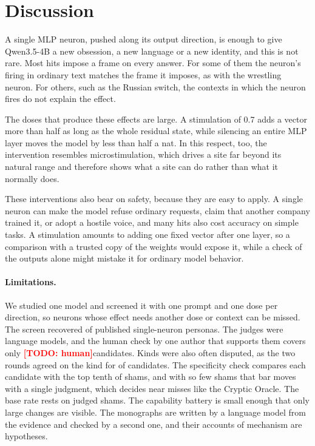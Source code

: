 \documentclass[11pt]{article}
\providecommand{\HumanRated}{\todo{human}}\providecommand{\HumanUnsure}{\todo{human}}\providecommand{\HumanChangeN}{\todo{human}}
\newcommand{\todo}[1]{\textcolor{red}{\textbf{[TODO: #1]}}}
\begin{document}
\section{Discussion}

A single MLP neuron, pushed along its output direction, is enough to give Qwen3.5-4B a new obsession, a new language
or a new identity, and this is not rare. Most hits impose a frame on every answer. For some of them the neuron's
firing in ordinary text matches the frame it imposes, as with the wrestling neuron. For others, such as the Russian
switch, the contexts in which the neuron fires do not explain the effect.

The doses that produce these effects are large. A stimulation of 0.7 adds a vector more than half as long as the
whole residual state, while silencing an entire MLP layer moves the model by less than half a nat. In this respect,
too, the intervention resembles microstimulation, which drives a site far beyond its natural range and therefore
shows what a site can do rather than what it normally does.

These interventions also bear on safety, because they are easy to apply. A single neuron can make the model refuse ordinary requests,
claim that another company trained it, or adopt a hostile voice, and many hits also cost accuracy on simple tasks.
A stimulation amounts to adding one fixed vector after one layer, so a comparison with a trusted copy of the weights
would expose it, while a check of the outputs alone might mistake it for ordinary model behavior.

\paragraph{Limitations.} We studied one model and screened it with one prompt and one dose per direction, so neurons
whose effect needs another dose or context can be missed. The screen recovered \RecallDisp of \NStandalone published
single-neuron personas. The judges were language models, and the human check by one author that supports them covers
only \HumanRated candidates. Kinds were also often disputed, as the two rounds agreed on the kind for \NKindAgree of
\NTwice candidates. The specificity check compares each candidate with the top tenth of \NShamJudged shams, and with so few
shams that bar moves with a single judgment, which decides near misses like the Cryptic Oracle. The base rate rests on
\NShamJudged judged shams. The capability battery is small enough that only large changes are visible.
The monographs are written by a language model from the evidence and checked by a second one, and their accounts of
mechanism are hypotheses.
\end{document}
